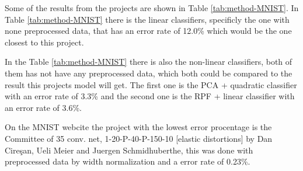 Some of the results from the projects are shown in Table \ref{tab:method-MNIST}.
In Table \ref{tab:method-MNIST} there is the linear classifiers, specificly the one with none preprocessed data, that has an error rate of 12.0\% which would be the one closest to this project.

In the Table \ref{tab:method-MNIST} there is also the non-linear classifiers, both of them has not have any preprocessed data, which both could be compared to the result this projects model will get. The first one is the PCA + quadratic classifier with an error rate of 3.3\% and the second one is the RPF + linear classifier with an error rate of 3.6\%.

On the MNIST webcite \cite{MNIST} the project with the lowest error procentage is the Committee of 35 conv. net, 1-20-P-40-P-150-10 [elastic distortions] by Dan Cireşan, Ueli Meier and Juergen Schmidhuberthe, this was done with preprocessed data by width normalization and a error rate of 0.23\%.
